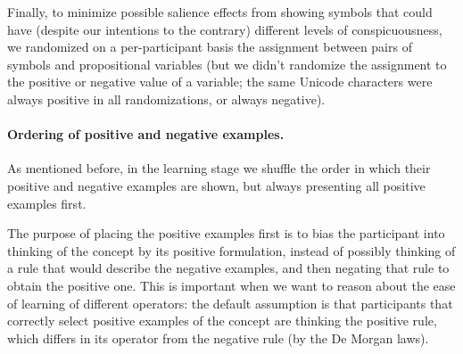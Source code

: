 Finally, to minimize possible salience effects from showing symbols that could have (despite our intentions to the contrary) different levels of conspicuousness, we randomized on a per-participant basis the assignment between pairs of symbols and propositional variables (but we didn't randomize the assignment to the positive or negative value of a variable; the same Unicode characters were always positive in all randomizations, or always negative).

\paragraph{Ordering of positive and negative examples.}
As mentioned before, in the learning stage we shuffle the order in which their positive and negative examples are shown, but always presenting all positive examples first.

The purpose of placing the positive examples first is to bias the participant into thinking of the concept by its positive formulation, instead of possibly thinking of a rule that would describe the negative examples, and then negating that rule to obtain the positive one. This is important when we want to reason about the ease of learning of different operators: the default assumption is %
 that participants that correctly select positive examples of the concept are thinking the positive rule, which differs in its operator from the negative rule (by the De Morgan laws). 
%






